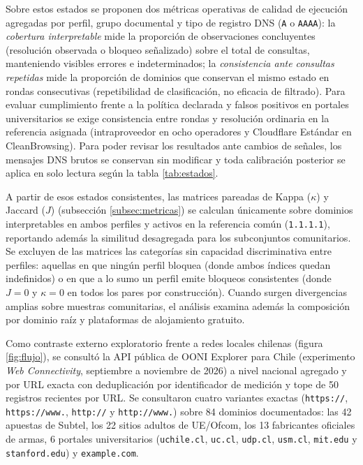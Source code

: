 \documentclass[10pt,a4paper]{article}
\begin{document}
Sobre estos estados se proponen dos métricas operativas de calidad de ejecución agregadas por perfil, grupo documental y tipo de registro DNS (\texttt{A} o \texttt{AAAA}): la \emph{cobertura interpretable} mide la proporción de observaciones concluyentes (resolución observada o bloqueo señalizado) sobre el total de consultas, manteniendo visibles errores e indeterminados; la \emph{consistencia ante consultas repetidas} mide la proporción de dominios que conservan el mismo estado en rondas consecutivas (repetibilidad de clasificación, no eficacia de filtrado). Para evaluar cumplimiento frente a la política declarada y falsos positivos en portales universitarios se exige consistencia entre rondas y resolución ordinaria en la referencia asignada (intraproveedor en ocho operadores y Cloudflare Estándar en CleanBrowsing). Para poder revisar los resultados ante cambios de señales, los mensajes DNS brutos se conservan sin modificar y toda calibración posterior se aplica en solo lectura según la tabla \ref{tab:estados}.

A partir de esos estados consistentes, las matrices pareadas de Kappa ($\kappa$) y Jaccard ($J$) (subsección \ref{subsec:metricas}) se calculan únicamente sobre dominios interpretables en ambos perfiles y activos en la referencia común (\texttt{1.1.1.1}), reportando además la similitud desagregada para los subconjuntos comunitarios. Se excluyen de las matrices las categorías sin capacidad discriminativa entre perfiles: aquellas en que ningún perfil bloquea (donde ambos índices quedan indefinidos) o en que a lo sumo un perfil emite bloqueos consistentes (donde $J = 0$ y $\kappa = 0$ en todos los pares por construcción). Cuando surgen divergencias amplias sobre muestras comunitarias, el análisis examina además la composición por dominio raíz y plataformas de alojamiento gratuito.

Como contraste externo exploratorio frente a redes locales chilenas (figura \ref{fig:flujo}), se consultó la API pública de OONI Explorer para Chile (experimento \emph{Web Connectivity}, septiembre a noviembre de 2026) a nivel nacional agregado y por URL exacta con deduplicación por identificador de medición y tope de 50 registros recientes por URL. Se consultaron cuatro variantes exactas (\texttt{https://}, \texttt{https://www.}, \texttt{http://} y \texttt{http://www.}) sobre 84 dominios documentados: las 42 apuestas de Subtel, los 22 sitios adultos de UE/Ofcom, los 13 fabricantes oficiales de armas, 6 portales universitarios (\texttt{uchile.cl}, \texttt{uc.cl}, \texttt{udp.cl}, \texttt{usm.cl}, \texttt{mit.edu} y \texttt{stanford.edu}) y \texttt{example.com}.
\end{document}
